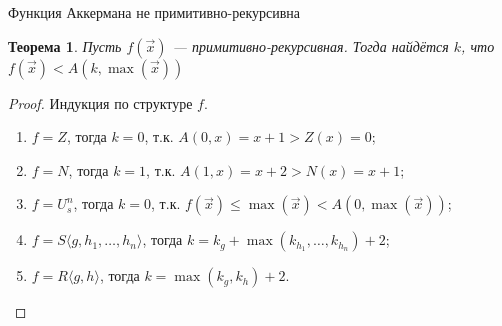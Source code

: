 \documentclass[handout]{beamer}
\newtheorem{thm}{Теорема}[section]
\begin{document}
\begin{frame}{Функция Аккермана не примитивно-рекурсивна}
\begin{thm}Пусть $f(\overrightarrow{x})$ --- примитивно-рекурсивная.
Тогда найдётся $k$, что $f(\overrightarrow{x}) < A(k,\max(\overrightarrow{x}))$\end{thm}

\begin{proof}
Индукция по структуре $f$.
\begin{enumerate}
\item $f = Z$, тогда $k = 0$, т.к. $A(0,x) = x+1 > Z(x) = 0$;
\item $f = N$, тогда $k = 1$, т.к. $A(1,x) = x + 2 > N(x) = x+1$;
\item $f = U^n_s$, тогда $k = 0$, т.к. $f(\overrightarrow{x}) \le \max(\overrightarrow{x}) < A(0,\max(\overrightarrow{x}))$;
\item $f = S\langle g,h_1,\dots,h_n\rangle$, тогда $k = k_g + \max(k_{h_1},\dots,k_{h_n}) + 2$;
\item $f = R\langle g,h \rangle$, тогда $k = \max(k_g,k_h)+2$. %
\end{enumerate}
\end{proof}
\end{frame}
\end{document}
